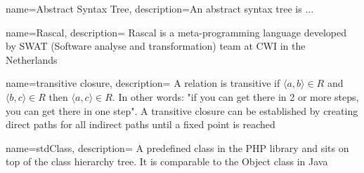 \documentclass[main.tex]{subfiles}
\begin{document}
    {
        name=Abstract Syntax Tree,
        description={An abstract syntax tree is ...}
    }
    
    {
        name=Rascal,
        description={
            Rascal is a meta-programming language developed by SWAT (Software analyse and transformation) team at CWI in the Netherlands}
    }
    
    {
        name=transitive closure,
        description={
            A relation is transitive if $\langle a,b \rangle \in R$ and $\langle b,c \rangle \in R$ then $\langle a,c \rangle \in R$. 
            In other words: "if you can get there in 2 or more steps, you can get there in one step".
            A transitive closure can be established by creating direct paths for all indirect paths until a fixed point is reached}
    }
    
    {
        name=stdClass,
        description={
            A predefined class in the PHP library and sits on top of the class hierarchy tree. 
            It is comparable to the Object class in Java}
    }
\end{document}
